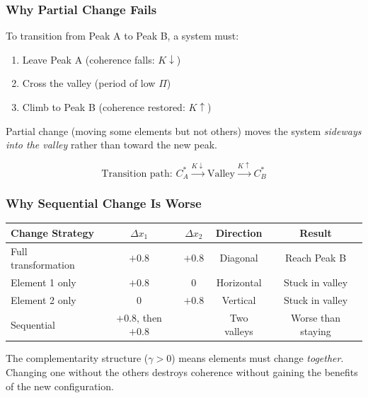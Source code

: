 \subsubsection{Why Partial Change Fails}

\begin{proposition}
\label{prop:nc-valley}
To transition from Peak A to Peak B, a system must:
\begin{enumerate}
\item Leave Peak A (coherence falls: $K \downarrow$)
\item Cross the valley (period of low $\Pi$)
\item Climb to Peak B (coherence restored: $K \uparrow$)
\end{enumerate}
Partial change (moving some elements but not others) moves the system \textit{sideways into the valley} rather than toward the new peak.
\end{proposition}

\begin{equation}
\text{Transition path: } C^*_A \xrightarrow{K \downarrow} \text{Valley} \xrightarrow{K \uparrow} C^*_B
\end{equation}

\subsubsection{Why Sequential Change Is Worse}

\begin{center}
\renewcommand{\arraystretch}{1.2}
\begin{tabular}{lcccc}
\hline
\textbf{Change Strategy} & $\Delta x_1$ & $\Delta x_2$ & Direction & Result \\
\hline
Full transformation & $+0.8$ & $+0.8$ & Diagonal & Reach Peak B \\
Element 1 only & $+0.8$ & $0$ & Horizontal & Stuck in valley \\
Element 2 only & $0$ & $+0.8$ & Vertical & Stuck in valley \\
Sequential & $+0.8$, then $+0.8$ & & Two valleys & Worse than staying \\
\hline
\end{tabular}
\end{center}

The complementarity structure ($\gamma > 0$) means elements must change \textit{together}. Changing one without the others destroys coherence without gaining the benefits of the new configuration.

